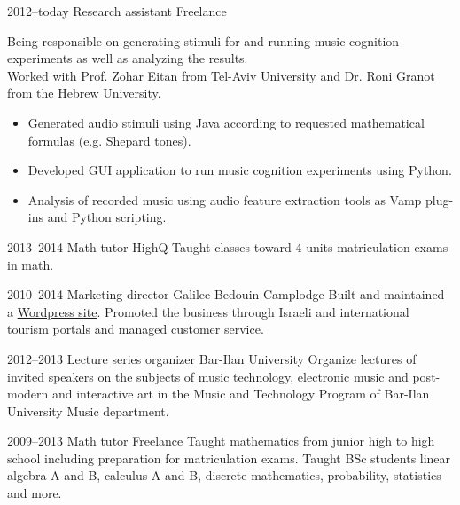 \documentclass[]{friggeri-cv}  %
\begin{document}
\begin{entrylist}

    \entry
    {2012--today}
    {Research assistant}
    {Freelance}
    {Being responsible on generating stimuli for and running music cognition experiments as well as analyzing the results.\\
    Worked with Prof. Zohar Eitan from Tel-Aviv University and Dr. Roni Granot from the Hebrew University.
    \begin{itemize}
    \item Generated audio stimuli using Java according to requested mathematical formulas (e.g. Shepard tones).
    \item Developed GUI application to run music cognition experiments using Python.
    \item Analysis of recorded music using audio feature extraction tools as Vamp plug-ins and Python scripting.
    \end{itemize}}
    
\end{entrylist}
\begin{entrylist}
    
    \entry
    {2013--2014}
    {Math tutor}
    {HighQ}
    {Taught classes toward 4 units matriculation exams in math.}
    
\end{entrylist}
\begin{entrylist}
    
    \entry
    {2010--2014}
    {Marketing director}
    {Galilee Bedouin Camplodge}
    {Built and maintained a \href{http://www.shevet-ahim.co.il/en/}{Wordpress site}.
    Promoted the business through Israeli and international tourism portals and managed customer service.}
    
\end{entrylist}
\begin{entrylist}

    \entry
    {2012--2013}
    {Lecture series organizer}
    {Bar-Ilan University}
    {Organize lectures of invited speakers on the subjects of music technology, electronic music and post-modern and interactive art in the Music and Technology Program of Bar-Ilan University Music department.}

\end{entrylist}
\begin{entrylist}

    \entry
    {2009--2013}
    {Math tutor}
    {Freelance}
    {Taught mathematics from junior high to high school including preparation for matriculation exams. Taught BSc students linear algebra A and B, calculus A and B, discrete mathematics, probability, statistics and more.}

\end{entrylist}
\end{document}
